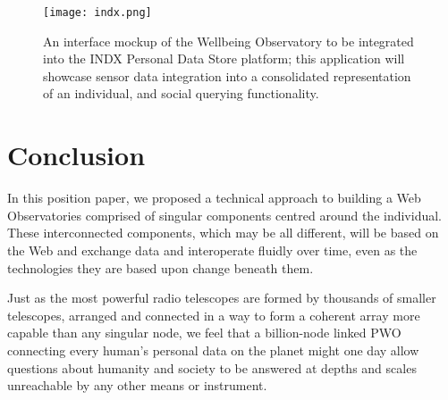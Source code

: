 \documentclass[letterpaper]{sig-alternate}
\begin{document}
\begin{figure}
\centering
\texttt{[image: indx.png]}
\caption{An interface mockup of the Wellbeing Observatory to be integrated into the INDX Personal Data Store platform; this application will showcase sensor data integration into a consolidated representation of an individual, and social querying functionality.}\label{fig:pho}
\end{figure}

\section{Conclusion}

In this position paper, we proposed a technical approach to building a Web Observatories comprised of singular components centred around the individual.  These interconnected components, which may be all different, will be based on the Web and exchange data and interoperate fluidly over time, even as the technologies they are based upon change beneath them.  

Just as the most powerful radio telescopes are formed by thousands of smaller telescopes, arranged and connected in a way to form a coherent array  more capable than any singular node, we feel that a billion-node linked PWO connecting every human's personal data on the planet might one day allow questions about humanity and society to be answered at depths and scales unreachable by any other means or instrument.




\balancecolumns
\end{document}
